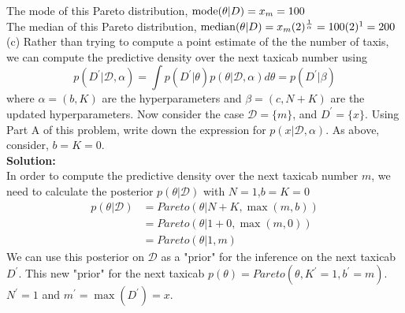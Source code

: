 \documentclass{article}
\begin{document}
The mode of this Pareto distribution, ${\rm mode}(\theta|D) = x_{m} = 100$ \\
The median of this Pareto distribution, ${\rm median}(\theta|D) = x_{m} (2)^{\frac{1}{\alpha}} = 100 (2)^{1} = 200$
\\
(c) Rather than trying to compute a point estimate of the the number of taxis, we can compute the predictive density over the next taxicab number using
\begin{equation}
    p(D^{'}|\mathcal{D},\alpha) = \int p(D^{'}|\theta) p(\theta|\mathcal{D},\alpha) d\theta = p(D^{'}|\beta)
\end{equation}
where $\alpha = (b,K)$ are the hyperparameters and $\beta = (c,N+K)$ are the updated hyperparameters. Now consider the case $\mathcal{D} = \{m\}$, and $D^{'} = \{x\}$. Using Part A of this problem, write down the expression for $p(x|\mathcal{D},\alpha)$. As above, consider, $b=K=0$. \\
\textbf{Solution:} \\
In order to compute the predictive density over the next taxicab number $m$, we need to calculate the posterior $p(\theta|\mathcal{D})$ with $N=1$,$b=K=0$
\begin{equation}
\begin{aligned}
p(\theta|\mathcal{D}) & = Pareto(\theta|N+K,\max{(m,b)}) \\
& = Pareto(\theta|1+0,\max{(m,0)}) \\
& = Pareto(\theta|1,m)
\end{aligned}
\end{equation}
We can use this posterior on $\mathcal{D}$ as a "prior" for the inference on the next taxicab $D^{'}$.
This new "prior" for the next taxicab $p(\theta) = Pareto(\theta,K^{'}=1,b^{'}=m)$.$N^{'} = 1$ and $m^{'} = \max{(D^{'})} = x$.
\end{document}
